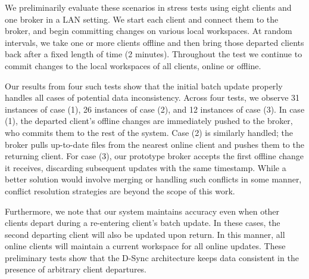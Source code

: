 We preliminarily evaluate these scenarios 
in stress tests using eight clients and one broker in a LAN setting.
We start each client and connect them to the broker,
and begin committing changes on various local workspaces.
At random intervals, we take one or more clients offline
and then bring those departed clients back after a fixed length of time (2 minutes).
Throughout the test we continue to commit changes to the local workspaces of all clients, online or offline.

Our results from four such tests show that the initial batch update
properly handles all cases of potential data inconsistency.
Across four tests, we observe 31 instances of case (1),
26 instances of case (2), and 12 instances of case (3).
In case (1), the departed client's offline changes are immediately pushed
to the broker,
who commits them to the rest of the system.
Case (2) is similarly handled;
the broker pulls up-to-date files from the nearest online client
and pushes them to the returning client.
For case (3), our prototype broker accepts the first
offline change it receives, discarding subsequent updates
with the same timestamp.
While a better solution would involve merging or handling
such conflicts in some manner,
conflict resolution strategies are beyond the scope of this work.

Furthermore, we note that our system maintains accuracy
even when other clients depart during a re-entering client's batch update.
In these cases, the second departing client
will also be updated upon return.
In this manner, all online clients will maintain a
current workspace for all online updates.
These preliminary tests show that the D-Sync architecture keeps data consistent
in the presence of arbitrary client departures.


